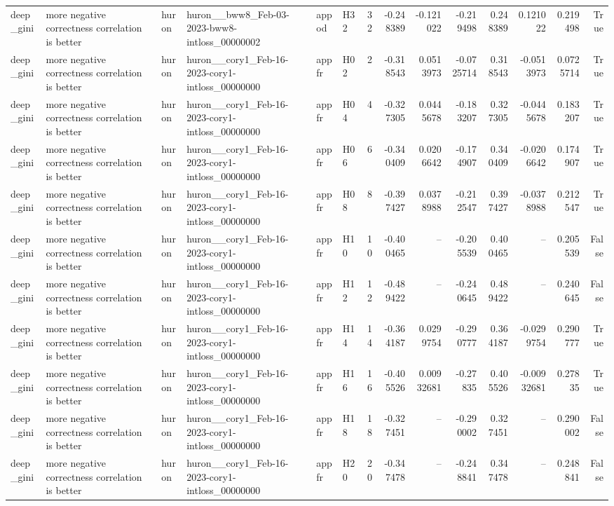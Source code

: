 \begin{longtable}{llllllrrrrrrrr}
deep\_gini & more negative correctness correlation is better & huron & huron\_\_bww8\_Feb-03-2023-bww8-intloss\_00000002 & appod & H32 & 32 & -0.248389 & -0.121022 & -0.219498 & 0.248389 & 0.121022 & 0.219498 & True \\
deep\_gini & more negative correctness correlation is better & huron & huron\_\_cory1\_Feb-16-2023-cory1-intloss\_00000000 & appfr & H02 & 2 & -0.318543 & 0.0513973 & -0.0725714 & 0.318543 & -0.0513973 & 0.0725714 & True \\
deep\_gini & more negative correctness correlation is better & huron & huron\_\_cory1\_Feb-16-2023-cory1-intloss\_00000000 & appfr & H04 & 4 & -0.327305 & 0.0445678 & -0.183207 & 0.327305 & -0.0445678 & 0.183207 & True \\
deep\_gini & more negative correctness correlation is better & huron & huron\_\_cory1\_Feb-16-2023-cory1-intloss\_00000000 & appfr & H06 & 6 & -0.340409 & 0.0206642 & -0.174907 & 0.340409 & -0.0206642 & 0.174907 & True \\
deep\_gini & more negative correctness correlation is better & huron & huron\_\_cory1\_Feb-16-2023-cory1-intloss\_00000000 & appfr & H08 & 8 & -0.397427 & 0.0378988 & -0.212547 & 0.397427 & -0.0378988 & 0.212547 & True \\
deep\_gini & more negative correctness correlation is better & huron & huron\_\_cory1\_Feb-16-2023-cory1-intloss\_00000000 & appfr & H10 & 10 & -0.400465 & -- & -0.205539 & 0.400465 & -- & 0.205539 & False \\
deep\_gini & more negative correctness correlation is better & huron & huron\_\_cory1\_Feb-16-2023-cory1-intloss\_00000000 & appfr & H12 & 12 & -0.489422 & -- & -0.240645 & 0.489422 & -- & 0.240645 & False \\
deep\_gini & more negative correctness correlation is better & huron & huron\_\_cory1\_Feb-16-2023-cory1-intloss\_00000000 & appfr & H14 & 14 & -0.364187 & 0.0299754 & -0.290777 & 0.364187 & -0.0299754 & 0.290777 & True \\
deep\_gini & more negative correctness correlation is better & huron & huron\_\_cory1\_Feb-16-2023-cory1-intloss\_00000000 & appfr & H16 & 16 & -0.405526 & 0.00932681 & -0.27835 & 0.405526 & -0.00932681 & 0.27835 & True \\
deep\_gini & more negative correctness correlation is better & huron & huron\_\_cory1\_Feb-16-2023-cory1-intloss\_00000000 & appfr & H18 & 18 & -0.327451 & -- & -0.290002 & 0.327451 & -- & 0.290002 & False \\
deep\_gini & more negative correctness correlation is better & huron & huron\_\_cory1\_Feb-16-2023-cory1-intloss\_00000000 & appfr & H20 & 20 & -0.347478 & -- & -0.248841 & 0.347478 & -- & 0.248841 & False \\

\end{longtable}
